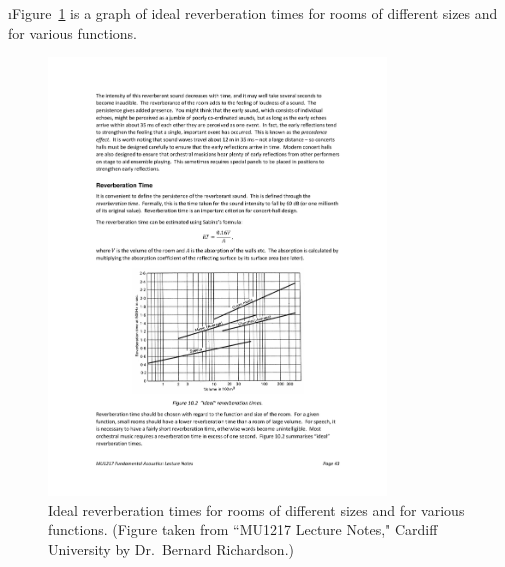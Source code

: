 \i Figure~\ref{f:ideal_reverb} is a graph of ideal
reverberation times for rooms of different sizes and
for various functions.
%
\begin{figure}[htbp]
\begin{center}
\includegraphics[width=0.8\textwidth]{ideal_reverb}
\caption{Ideal reverberation times for rooms of 
different sizes and for various functions.
(Figure taken from 
``MU1217 Lecture Notes," Cardiff University
by Dr.~Bernard Richardson.)}
\label{f:ideal_reverb}
\end{center}
\end{figure}
%

